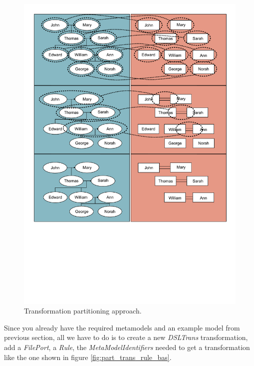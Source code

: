 \begin{figure}[h]
\begin{center}
  \includegraphics[scale=0.6, trim=0.9cm 8cm 0.7cm 0.8cm,
  clip]{imgs/transformation_natural.pdf}
  \caption{Transformation partitioning approach.}
  \label{fig:transformation_natural}
\end{center}
\end{figure}

Since you already have the required metamodels and an example model from
previous section, all we have to do is to create a new \emph{DSLTrans} transformation,
add a \emph{FilePort}, a \emph{Rule}, the \emph{MetaModelIdentifiers} needed to
get a transformation like the one shown in figure \ref{fig:part_trans_rule_bas}.

